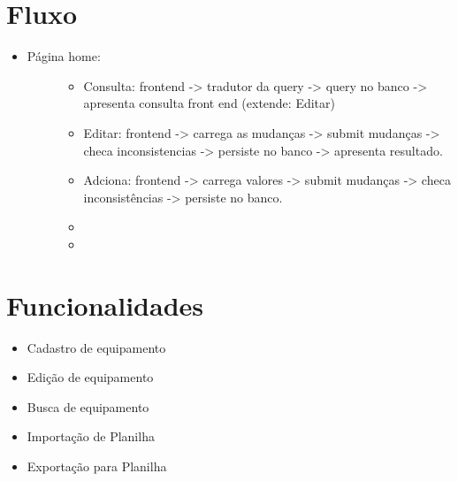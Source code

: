\documentclass[letterpaper,10pt,openany,oneside,portuges]{sphinxmanual}
\begin{document}
\chapter{Fluxo}
\label{\detokenize{fluxo::doc}}\label{\detokenize{fluxo:fluxo}}\begin{itemize}
\item {} \begin{description}
\item[{Página home:}] \leavevmode\begin{itemize}
\item {} 
Consulta: frontend -\textgreater{} tradutor da query -\textgreater{} query no banco -\textgreater{} apresenta consulta front end (extende: Editar)

\item {} 
Editar: frontend -\textgreater{} carrega as mudanças -\textgreater{} submit mudanças -\textgreater{} checa inconsistencias -\textgreater{} persiste no banco -\textgreater{} apresenta resultado.

\item {} 
Adciona: frontend -\textgreater{} carrega valores -\textgreater{} submit mudanças -\textgreater{} checa inconsistências -\textgreater{} persiste no banco.

\item {} 

\item {} 

\end{itemize}

\end{description}

\end{itemize}


\chapter{Funcionalidades}
\label{\detokenize{funcionalidades:funcionalidades}}\label{\detokenize{funcionalidades::doc}}\begin{itemize}
\item {} 
Cadastro de equipamento

\item {} 
Edição de equipamento

\item {} 
Busca de equipamento

\item {} 
Importação de Planilha

\item {} 
Exportação para Planilha

\end{itemize}



\renewcommand{\indexname}{Índice}
\printindex
\end{document}
